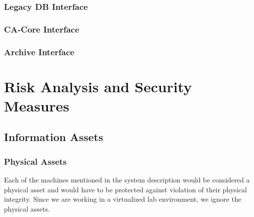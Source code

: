 \documentclass{article}
\begin{document}
\subsubsection{Legacy DB Interface}

\subsubsection{CA-Core Interface}

\subsubsection{Archive Interface}

\section{Risk Analysis and Security Measures}

\subsection{Information Assets}

\subsubsection{Physical Assets}
Each of the machines mentioned in the system description would be considered a physical asset and would have to be protected against violation of their physical integrity. Since we are working in a virtualized lab environment, we ignore the physical assets.
\end{document}
